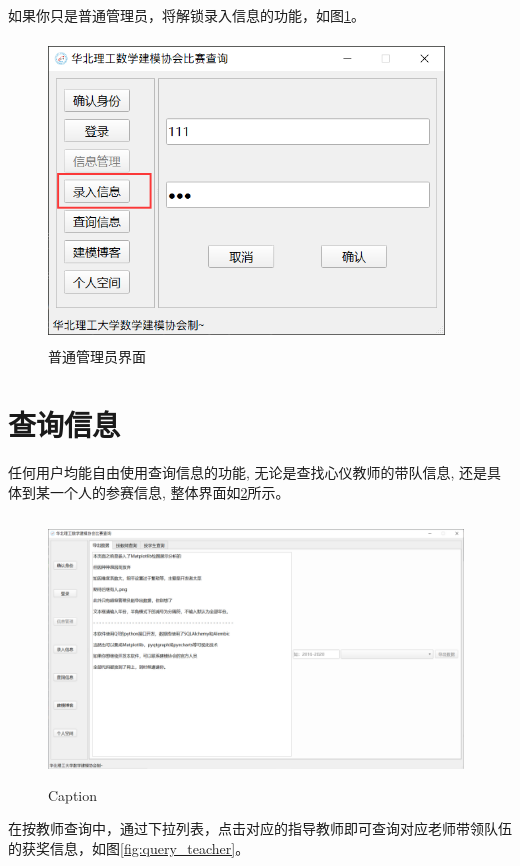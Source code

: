 \documentclass[cn,11pt,chinese, hazy]{elegantbook}
\begin{document}
\newpage

如果你只是普通管理员，将解锁录入信息的功能，如图\ref{fig:admin}。

\begin{figure}[h]
    \centering
    \includegraphics[width=10.5cm, height=8cm]{figure/5.png}
    \caption{普通管理员界面}
    \label{fig:admin}
\end{figure}

\section{查询信息}

任何用户均能自由使用查询信息的功能, 无论是查找心仪教师的带队信息, 还是具体到某一个人的参赛信息, 
整体界面如\ref{fig:query}所示。

\begin{figure}[h]
    \centering
    \includegraphics[width=11cm, height=7cm]{figure/6.png}
    \caption{Caption}
    \label{fig:query}
\end{figure}

在按教师查询中，通过下拉列表，点击对应的指导教师即可查询对应老师带领队伍的获奖信息，如图\ref{fig:query_teacher}。
\end{document}
